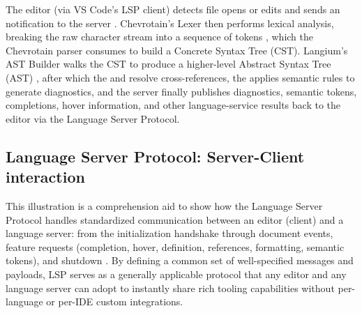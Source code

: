 \vspace{0.5em}

The editor (via VS Code's LSP client) detects file opens or edits and sends an  notification to the server \cite{vscode-lsp}. Chevrotain's Lexer then performs lexical analysis,
breaking the raw character stream into a sequence of tokens \cite{chevrotain-docs}, which the Chevrotain parser consumes to build a Concrete Syntax Tree (CST). Langium's AST Builder walks the CST to produce
a higher-level Abstract Syntax Tree (AST) \cite{langium-doc-lifecycle}, after which the  and  resolve cross-references, the  applies semantic rules
to generate diagnostics, and the server finally publishes diagnostics, semantic tokens, completions, hover information, and other language-service results back to the editor via the
Language Server Protocol.

\subsection*{Language Server Protocol: Server-Client interaction}

This illustration is a comprehension aid to show how the Language Server Protocol handles standardized communication between an editor (client) and a language server:
from the initialization handshake through document events, feature requests (completion, hover, definition, references, formatting, semantic tokens), and shutdown \cite{lspFeatures}.
By defining a common set of well-specified messages and payloads, LSP serves as a generally applicable protocol that any editor and any language server can adopt to instantly
share rich tooling capabilities without per-language or per-IDE custom integrations.

